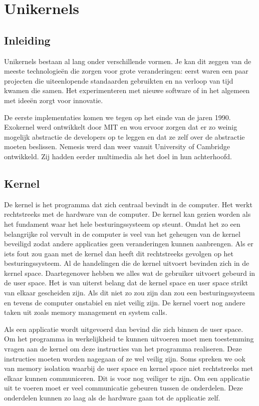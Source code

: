 \documentclass[pdftex,a4paper,12pt,twoside]{report}
\begin{document}
\chapter{Unikernels}
\label{ch:unikernels}

\section{Inleiding}

Unikernels bestaan al lang onder verschillende vormen. Je kan dit zeggen van de meeste technologieën die zorgen voor grote veranderingen: eerst waren een paar projecten die uiteenlopende standaarden gebruikten en na verloop van tijd kwamen die samen. Het experimenteren met nieuwe software of in het algemeen met ideeën zorgt voor innovatie. 

De eerste implementaties komen we tegen op het einde van de jaren 1990. Exokernel werd ontwikkelt door MIT en wou ervoor zorgen dat er zo weinig mogelijk abstractie de developers op te leggen en dat ze zelf over de abstractie moeten beslissen. Nemesis werd dan weer vanuit University of Cambridge ontwikkeld. Zij hadden eerder multimedia als het doel in hun achterhoofd. 

\section{Kernel}

De kernel is het programma dat zich centraal bevindt in de computer. Het werkt rechtstreeks met de hardware van de computer.  De kernel kan gezien worden als het fundament waar het hele besturingssysteem op steunt. Omdat het zo een belangrijke rol vervult in de computer is veel van het geheugen van de kernel beveiligd zodat andere applicaties geen veranderingen kunnen aanbrengen. Als er iets fout zou gaan met de kernel dan heeft dit rechtstreeks gevolgen op het besturingssysteem. Al de handelingen die de kernel uitvoert bevinden zich in de kernel space. Daartegenover hebben we alles wat de gebruiker uitvoert gebeurd in de user space. Het is van uiterst belang dat de kernel space en user space strikt van elkaar gescheiden zijn. Als dit niet zo zou zijn dan zou een besturingssysteem en tevens de computer onstabiel en niet veilig zijn. De kernel voert nog andere taken uit zoals memory management en system calls.

Als een applicatie wordt uitgevoerd dan bevind die zich binnen de user space. Om het programma in werkelijkheid te kunnen uitvoeren moet men toestemming vragen aan de kernel om deze instructies van het programma realiseren. Deze instructies moeten worden nagegaan of ze wel veilig zijn.  Soms spreken we ook van memory isolation waarbij de user space en kernel space niet rechtstreeks met elkaar kunnen communiceren. Dit is voor nog veiliger te zijn. Om een applicatie uit te voeren moet er veel communicatie gebeuren tussen de onderdelen. Deze onderdelen kunnen zo laag als de hardware gaan tot de applicatie zelf.
\end{document}
